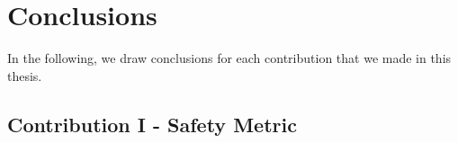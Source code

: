 \section{Conclusions}\label{sec:conclusion:conclusions}
In the following, we draw conclusions for each contribution that we made in this thesis.

\subsection{Contribution I - Safety Metric}
